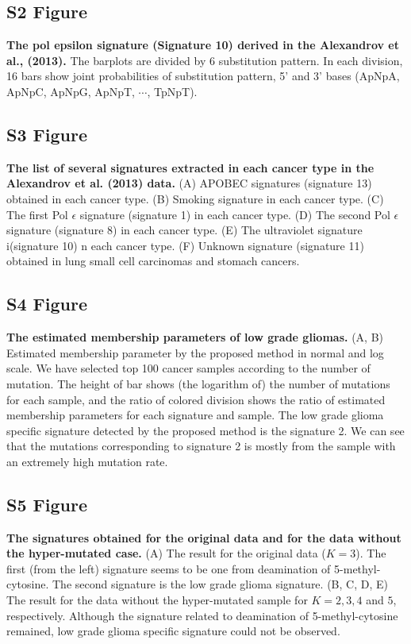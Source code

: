 \documentclass[10pt,letterpaper]{article}
\begin{document}
\subsection*{S2 Figure}
\label{nature2013_POLE}
{\bf The pol epsilon signature (Signature 10) derived in the Alexandrov et al., (2013).}
The barplots are divided by 6 substitution pattern. 
In each division, 16 bars show joint probabilities of substitution pattern, 5' and 3' bases (ApNpA, ApNpC, ApNpG, ApNpT, $\cdots$, TpNpT).

\subsection*{S3 Figure}
\label{nature2013_sig_list}
{\bf The list of several signatures extracted in each cancer type in the Alexandrov et al. (2013) data.}
(A) APOBEC signatures (signature 13) obtained in each cancer type.
(B) Smoking signature in each cancer type.
(C) The first Pol $\epsilon$ signature (signature 1)  in each cancer type.
(D) The second Pol $\epsilon$ signature (signature 8) in each cancer type.
(E) The ultraviolet signature i(signature 10) n each cancer type.
(F) Unknown signature (signature 11) obtained in lung small cell carcinomas and stomach cancers.


\subsection*{S4 Figure}
\label{LGG_membership}
{\bf The estimated membership parameters of low grade gliomas.}
(A, B) Estimated membership parameter by the proposed method in normal and log scale.
We have selected top 100 cancer samples according to the number of mutation.
The height of bar shows (the logarithm of) the number of mutations for each sample,
and the ratio of colored division shows the ratio of estimated membership parameters for each signature and sample.
The low grade glioma specific signature detected by the proposed method is the signature 2.
We can see that the mutations corresponding to signature 2 is mostly from the sample with an extremely high mutation rate.


\subsection*{S5 Figure}
\label{LGG_signatures}
{\bf The signatures obtained for the original data and for the data without the hyper-mutated case.}
(A) The result for the original data ($K = 3$). The first (from the left) signature seems to be one from deamination of 5-methyl-cytosine. 
The second signature is the low grade glioma signature.
(B, C, D, E) The result for the data without the hyper-mutated sample for $K = 2, 3, 4$ and $5$, respectively.
Although the signature related to deamination of 5-methyl-cytosine remained, low grade glioma specific signature could not be observed.
\end{document}
